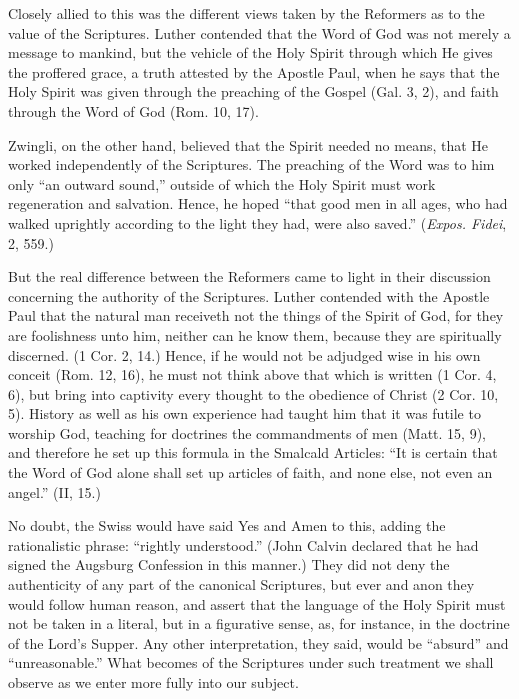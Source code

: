 \documentclass[
]{book}
\begin{document}
Closely allied to this was the different views taken by the Reformers as to the value of the Scriptures. Luther contended that the Word of God was not merely a message to mankind, but the vehicle of the Holy Spirit through which He gives the proffered grace, a truth attested by the Apostle Paul, when he says that the Holy Spirit was given through the preaching of the Gospel (Gal. 3, 2), and faith through the Word of God (Rom. 10, 17).

Zwingli, on the other hand, believed that the Spirit needed no means, that He worked independently of the Scriptures. The preaching of the Word was to him only ``an outward sound,'' outside of which the Holy Spirit must work regeneration and salvation. Hence, he hoped ``that good men in all ages, who had walked uprightly according to the light they had, were also saved.'' (\emph{Expos. Fidei}, 2, 559.)

But the real difference between the Reformers came to light in their discussion concerning the authority of the Scriptures. Luther contended with the Apostle Paul that the natural man receiveth not the things of the Spirit of God, for they are foolishness unto him, neither can he know them, because they are spiritually discerned. (1 Cor. 2, 14.) Hence, if he would not be adjudged wise in his own conceit (Rom. 12, 16), he must not think above that which is written (1 Cor. 4, 6), but bring into captivity every thought to the obedience of Christ (2 Cor. 10, 5). History as well as his own experience had taught him that it was futile to worship God, teaching for doctrines the commandments of men (Matt. 15, 9), and therefore he set up this formula in the Smalcald Articles: ``It is certain that the Word of God alone shall set up articles of faith, and none else, not even an angel.'' (II, 15.)

No doubt, the Swiss would have said Yes and Amen to this, adding the rationalistic phrase: ``rightly understood.'' (John Calvin declared that he had signed the Augsburg Confession in this manner.) They did not deny the authenticity of any part of the canonical Scriptures, but ever and anon they would follow human reason, and assert that the language of the Holy Spirit must not be taken in a literal, but in a figurative sense, as, for instance, in the doctrine of the Lord's Supper. Any other interpretation, they said, would be ``absurd'' and ``unreasonable.'' What becomes of the Scriptures under such treatment we shall observe as we enter more fully into our subject.
\end{document}
